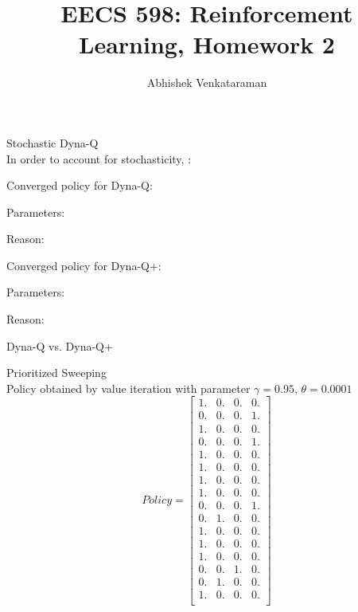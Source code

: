 \documentclass[12pt]{article}
\newenvironment{problem}[2][\large Problem]{\begin{trivlist}
\item[\hskip \labelsep {\bfseries #1}\hskip \labelsep {\bfseries #2.}]}{\end{trivlist}}
\begin{document}
 
 
 
\title{EECS 598: Reinforcement Learning, Homework 2}%
\author{Abhishek Venkataraman} %
 
\maketitle
 
\begin{problem} {1} Stochastic Dyna-Q
\\
In order to account for stochasticity, :

Converged policy for Dyna-Q:

Parameters:

Reason:

Converged policy for Dyna-Q+:

Parameters:

Reason:


\end{problem}


\begin{problem} {2} Dyna-Q vs. Dyna-Q+\\
	
\end{problem}
\begin{problem} {3} Prioritized Sweeping\\
	
Policy obtained by value iteration with parameter $\gamma = 0.95 $, $\theta = 0.0001$
$$ Policy = \begin{bmatrix} 
 1.&  0.&  0.&  0.\\
 0.&  0.&  0.&  1.\\
 1.&  0.&  0.&  0.\\
 0.&  0.&  0.& 1.\\
 1.&  0.&  0.&  0.\\
 1.&  0.&  0.&  0.\\
 1.&  0.&  0.&  0.\\
 1.&  0.&  0.&  0.\\
 0.&  0.&  0.&  1.\\
 0.&  1.&  0.&  0.\\
 1.&  0.&  0.&  0.\\
 1.&  0.&  0.&  0.\\
 1.&  0.&  0.&  0.\\
 0.&  0.&  1.&  0.\\
 0.&  1.&  0.&  0.\\
 1.&  0.&  0.&  0.\\
\end{bmatrix} $$ 
\end{problem}
\end{document}
